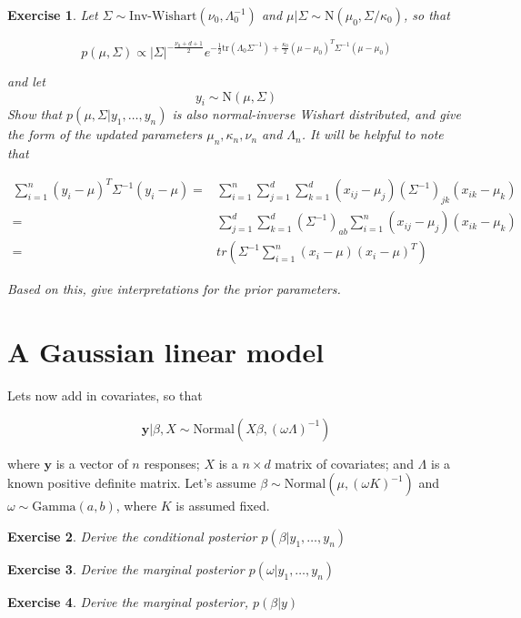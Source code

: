 \documentclass[twoside]{article}
\newcounter{lecnum}
\newtheorem{exercise}{Exercise}[lecnum]
\begin{document}
\begin{exercise}
  Let $\Sigma \sim \mbox{Inv-Wishart}(\nu_0, \Lambda_0^{-1})$ and $\mu|\Sigma \sim \mbox{N}(\mu_0, \Sigma/\kappa_0)$, so that

  $$p(\mu,\Sigma) \propto |\Sigma|^{-\frac{\nu_0+d+1}{2}}e^{-\frac{1}{2}\mbox{tr}(\Lambda_0\Sigma^{-1}) + \frac{\kappa_0}{2}(\mu-\mu_0)^T\Sigma^{-1}(\mu-\mu_0)}$$

  and let
  $$y_i \sim \mbox{N}(\mu, \Sigma)$$
  Show that $p(\mu, \Sigma|y_1,\dots,y_n)$ is also normal-inverse Wishart distributed, and give the form of the updated parameters $\mu_n, \kappa_n, \nu_n$ and $\Lambda_n$. It will be helpful to note that

  $$\begin{aligned}\sum_{i=1}^n(y_i-\mu)^T\Sigma^{-1}(y_i-\mu) =& \sum_{i=1}^n\sum_{j=1}^d\sum_{k=1}^d(x_{ij}-\mu_j)(\Sigma^{-1})_{jk}(x_{ik}-\mu_k)\\
    =& \sum_{j=1}^d\sum_{k=1}^d (\Sigma^{-1})_{ab}\sum_{i=1}^n(x_{ij}-\mu_j)(x_{ik}-\mu_k)\\
    =& tr\left(\Sigma^{-1}\sum_{i=1}^n(x_i-\mu)(x_i-\mu)^T\right)\end{aligned}$$
  
  Based on this, give interpretations for the prior parameters.
\end{exercise}
\newpage
\section{A Gaussian linear model}
Lets now add in covariates, so that

$$\mathbf{y}|\beta, X \sim \mbox{Normal}(X\beta, (\omega \Lambda)^{-1})$$

where $\mathbf{y}$ is a vector of $n$ responses; $X$ is a $n\times d$ matrix of covariates; and $\Lambda$ is a known positive definite matrix.
Let's assume $\beta\sim \mbox{Normal}(\mu, (\omega K)^{-1})$ and $\omega \sim \mbox{Gamma}(a,b)$, where $K$ is assumed fixed.


\begin{exercise}
  Derive the conditional posterior $p(\beta|y_1,\dots, y_n)$
\end{exercise}

\begin{exercise}
  Derive the marginal posterior $p(\omega|y_1,\dots, y_n)$
\end{exercise}

\begin{exercise}
  Derive the marginal posterior, $p(\beta|y)$
\end{exercise}
\end{document}
